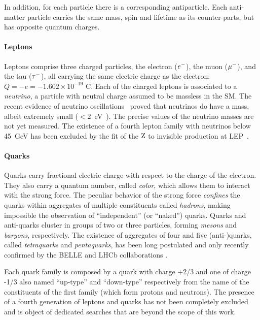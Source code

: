 In addition, for each particle there is a corresponding antiparticle. Each anti-matter particle carries the same mass, spin and lifetime as its counter-parts, but has opposite quantum charges.

\paragraph{Leptons} 

Leptons comprise three charged particles, the electron ($e\-$), the muon ($\mu\-$), and the tau ($\tau\-$), all carrying the same electric charge as the electron: $Q = -e = -1.602 \times 10^{-19}$ C. Each of the charged leptons is associated to a \emph{neutrino}, a particle with neutral charge assumed to be massless in the SM. The recent evidence of neutrino oscillations~\cite{Agafonova:2010dc} proved that neutrinos do have a mass, albeit extremely small ($< 2$~eV~\cite{pdg}). The precise values of the neutrino masses are not yet measured. The existence of a fourth lepton family with neutrinos below 45~GeV has been excluded by the fit of the $\Z$ to invisible production at LEP~\cite{ALEPH:2005ab}. 

\paragraph{Quarks}

Quarks carry fractional electric charge with respect to the charge of the electron. They also carry a quantum number, called \emph{color}, which allows them to interact with the strong force. The peculiar behavior of the strong force \emph{confines} the quarks within aggregates of multiple constituents called \emph{hadrons}, making impossible the observation of ``independent'' (or ``naked'') quarks. Quarks and anti-quarks cluster in groups of two or three particles, forming \emph{mesons} and \emph{baryons}, respectively. The existence of aggregates of four and five (anti-)quarks, called \emph{tetraquarks} and \emph{pentaquarks}, has been long postulated and only recently confirmed by the BELLE \cite{Choi:2007wga} and LHCb collaborations \cite{Aaij:2014jqa}.

Each quark family is composed by a quark with charge +2/3 and one of charge -1/3 also named ``up-type'' and ``down-type'' respectively from the name of the constituents of the first family (which form protons and neutrons). The presence of a fourth generation of leptons and quarks has not been completely excluded and is object of dedicated searches that are beyond the scope of this work.

